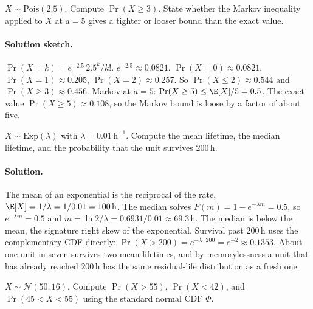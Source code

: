 \begin{exercise}
$X \sim \mathrm{Pois}(2.5)$. Compute $\Pr(X \geq 3)$. State whether
the Markov inequality applied to $X$ at $a = 5$ gives a tighter or
looser bound than the exact value.
\end{exercise}

\paragraph{Solution sketch.}
$\Pr(X = k) = e^{-2.5}\, 2.5^{k}/k!$. $e^{-2.5} \approx 0.0821$.
$\Pr(X = 0) \approx 0.0821$, $\Pr(X = 1) \approx 0.205$,
$\Pr(X = 2) \approx 0.257$. So $\Pr(X \leq 2) \approx 0.544$ and
$\Pr(X \geq 3) \approx 0.456$. Markov at $a = 5$:
$\Pr(X \geq 5) \leq \E[X]/5 = 0.5$. The exact value
$\Pr(X \geq 5) \approx 0.108$, so the Markov bound is loose by a
factor of about five.

\begin{exercise}
$X \sim \mathrm{Exp}(\lambda)$ with $\lambda = 0.01\,\text{h}^{-1}$.
Compute the mean lifetime, the median lifetime, and the probability
that the unit survives $200\,\text{h}$.
\end{exercise}

\paragraph{Solution.}
The mean of an exponential is the reciprocal of the rate,
$\E[X] = 1/\lambda = 1/0.01 = 100\,\text{h}$. The median solves
$F(m) = 1 - e^{-\lambda m} = 0.5$, so $e^{-\lambda m} = 0.5$ and
$m = \ln 2 / \lambda = 0.6931/0.01 \approx 69.3\,\text{h}$. The
median is below the mean, the signature right skew of the
exponential. Survival past $200\,\text{h}$ uses the complementary
CDF directly: $\Pr(X > 200) = e^{-\lambda \cdot 200} = e^{-2}
\approx 0.1353$. About one unit in seven survives two mean
lifetimes, and by memorylessness a unit that has already reached
$200\,\text{h}$ has the same residual-life distribution as a fresh
one.

\begin{exercise}
$X \sim \mathcal{N}(50, 16)$. Compute $\Pr(X > 55)$, $\Pr(X < 42)$,
and $\Pr(45 < X < 55)$ using the standard normal CDF $\Phi$.
\end{exercise}

